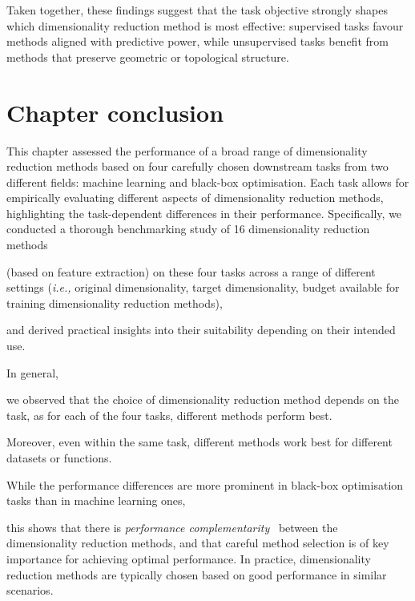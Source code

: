 Taken together, these findings suggest that the task objective strongly shapes which dimensionality reduction method is most effective: supervised tasks favour methods aligned with predictive power, while unsupervised tasks benefit from methods that preserve geometric or topological structure.










\section{Chapter conclusion}
\label{sec:ch04:concl}



This chapter assessed the performance of a broad range of dimensionality reduction methods based on four carefully chosen downstream tasks from two different fields: machine learning and black-box optimisation.
Each task allows for empirically evaluating different aspects of dimensionality reduction methods, highlighting the task-dependent differences in their performance.
Specifically, we conducted a thorough benchmarking study of 16 dimensionality reduction methods 

(based on feature extraction) 
on these four tasks across a range of different settings (\emph{i.e.,} original dimensionality, target dimensionality, budget available for training dimensionality reduction methods), 

and derived practical insights into their suitability depending on their intended use.







In general, 

we observed that the choice of dimensionality reduction method depends on the task, as for each of the four tasks, different methods perform best. 

Moreover, even within the same task, different methods work best for different datasets or functions. 

While the performance differences are more prominent in  black-box optimisation tasks than in machine learning ones,

this shows that there is \textit{performance complementarity}~\cite{Rice76,FreEtAl16} between the dimensionality reduction methods, and that careful method selection is of key importance for achieving optimal performance.
In practice, dimensionality reduction methods are typically chosen based on good performance in similar scenarios.


